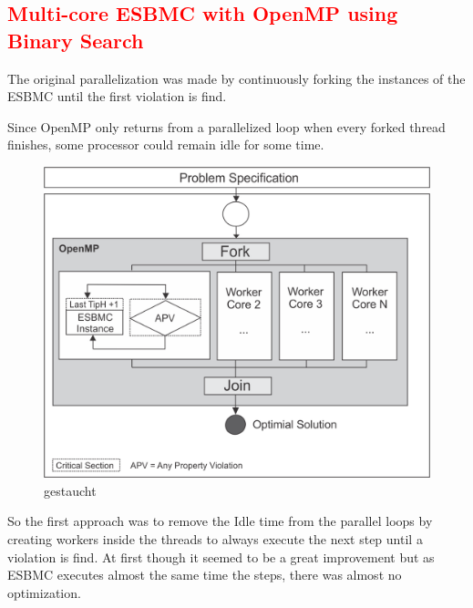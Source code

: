 \subsection{\textcolor{Red}{Multi-core ESBMC with OpenMP using Binary Search}}
The original parallelization was made by continuously forking the instances of the ESBMC until the first violation is find. 

Since OpenMP only returns from a parallelized loop when every forked thread finishes, some processor could remain idle for some time.
\begin{figure}[ht]
	\centering
  \includegraphics[scale=0.75]{Image/esbmc-parallel.png} 
	\caption{gestaucht}
	\label{fig2}
\end{figure}
So the first approach was to remove the Idle time from the parallel loops by creating workers inside the threads to always execute the next step until a violation is find. At first though it seemed to be a great improvement but as ESBMC executes almost the same time the steps, there was almost no optimization. 

